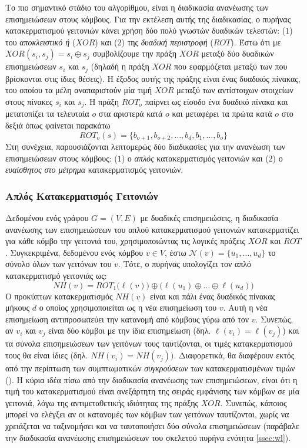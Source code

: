 Το πιο σημαντικό στάδιο του αλγορίθμου, είναι η διαδικασία ανανέωσης των επισημειώσεων στους κόμβους.
Για την εκτέλεση αυτής της διαδικασίας, ο πυρήνας κατακερματισμού γειτονιών κάνει χρήση δύο πολύ γνωστών δυαδικών τελεστών: ($1$) του \textit{αποκλειστικό ή} ($XOR$) και ($2$) της \textit{δυαδική περιστροφή} ($ROT$).
Έστω ότι με $XOR(s_i, s_j) = s_i \oplus s_j$ συμβολίζουμε την πράξη $XOR$ μεταξύ δύο δυαδικών επισημειώσεων $s_i$ και $s_j$ (δηλαδή η πράξη $XOR$ που εφαρμόζεται μεταξύ των  που βρίσκονται στις ίδιες θέσεις).
Η έξοδος αυτής της πράξης είναι ένας δυαδικός πίνακας, του οποίου τα μέλη αναπαριστούν μία τιμή $XOR$ μεταξύ των αντίστοιχων στοιχείων στους πίνακες $s_i$ και $s_j$.
Η πράξη $ROT_o$ παίρνει ως είσοδο ένα δυαδικό πίνακα και μετατοπίζει τα τελευταία $o$  στα αριστερά κατά $o$  και μεταφέρει τα πρώτα κατά $o$ στο δεξιά όπως φαίνεται παρακάτω
\begin{equation}
    ROT_o(s) = \{ b_{o+1}, b_{o+2}, \ldots, b_d, b_1, \ldots, b_o \}
\end{equation}
Στη συνέχεια, παρουσιάζονται λεπτομερώς δύο διαδικασίες για την ανανέωση των επισημειώσεων στους κόμβους: ($1$) ο \textit{απλός} κατακερματισμός γειτονιών και ($2$) ο \textit{ευαίσθητος στο μέτρημα} κατακερματισμός γειτονιών.

\subsubsection{Απλός Κατακερματισμός Γειτονιών}
Δεδομένου ενός γράφου $G=(V,E)$ με δυαδικές επισημειώσεις, η διαδικασία ανανέωσης των επισημειώσεων του απλού κατακερματισμού γειτονιών κατακερματίζει για κάθε κόμβο την γειτονιά του, χρησιμοποιώντας τις λογικές πράξεις $XOR$ και $ROT$.
Συγκεκριμένα, δεδομένου ενός κόμβου $v \in V$, έστω $\mathcal{N}(v)=\{ u_1,\ldots,u_d \}$ το σύνολο όλων των γειτόνων του $v$.
Τότε, ο πυρήνας υπολογίζει τον απλό κατακερματισμό γειτονιάς ως:
\begin{equation}
    NH(v) = ROT_1 \big( \ell(v) \big) \oplus \big( \ell(u_1) \oplus \ldots \oplus \ell(u_d) \big)
\end{equation}
Ο προκύπτων κατακερματισμός $NH(v)$ είναι και πάλι ένας δυαδικός πίνακας μήκους $d$ ο οποίος χρησιμοποιείται ως η νέα επισημείωση του $v$.
Αυτή η νέα επισημείωση αντιπροσωπεύει την κατανομή από κόμβους γύρω από τον $v$.
Συνεπώς, αν $v_i$ και $v_j$ είναι δύο κόμβοι με την ίδια επισημείωση (δηλ. $\ell(v_i) = \ell(v_j)$) και τα σύνολα επισημειώσεων των γειτόνων τους ταυτίζονται, οι τιμές κατακερματισμού τους θα είναι ίδιες (δηλ. $NH(v_i) = NH(v_j))$.
Διαφορετικά, θα διαφέρουν εκτός από την περίπτωση των συμπτωματικών \textit{συγκρούσεων} των κατακερματισμένων τιμών ().
Η κύρια ιδέα πίσω από την διαδικασία ανανέωσης των επισημειώσεων, είναι ότι η τιμή του κατακερματισμού είναι ανεξάρτητη της σειράς εμφάνισης των κόμβων σε μία γειτονιά, λόγω της αντιμεταθετικής ιδιότητας της πράξης $XOR$.
Συνεπώς, κάποιος μπορεί να ελέγξει αν οι κατανομές των κόμβων των γειτόνων ταυτίζονται, χωρίς να χρειάζεται να ταξινομήσει και να ταυτοποιήσει δύο σύνολα επισημειώσεων (παράβαλε την διαδικασία ανανέωσης επισημειώσεων του σκελετού πυρήνα  ενότητα \ref{ssec:wl}).

